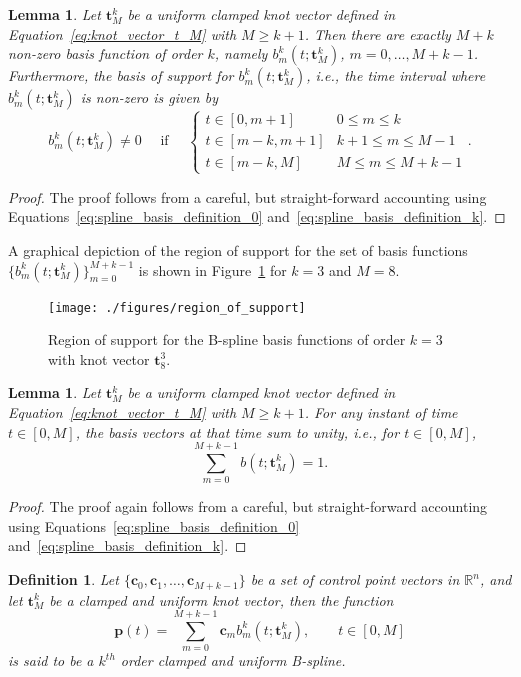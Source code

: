 \documentclass{article}
\newtheorem{lemma}[theorem]{Lemma}
\newtheorem{definition}[theorem]{Definition}
\newcommand{\cbf}{\mathbf{c}}
\begin{document}
\begin{lemma} \label{lem:nonzero_basis_vectors}
	Let $\mathbf{t}_M^k$ be a uniform clamped knot vector defined in Equation~\eqref{eq:knot_vector_t_M} with $M\geq k+1$.
	Then there are exactly $M+k$ non-zero basis function of order $k$, namely $b_m^k(t;\mathbf{t}_M^k)$, $m=0, \dots, M+k-1$.
	Furthermore, the basis of support for $b_m^k(t;\mathbf{t}_M^k)$, i.e., the time interval where $b_m^k(t;\mathbf{t}_M^k)$ is non-zero is given by
		\[
				b_m^k(t;\mathbf{t}_M^k) \neq 0 
				\quad \text{~if~} \quad
				\begin{cases}
				t \in [0, m+1] & 0\leq m \leq k \\
				t \in [m-k, m+1] & k+1 \leq m \leq M-1 \\
				t \in [m-k, M] & M \leq m \leq M+k-1
				\end{cases}.
		\]	
\end{lemma}
\begin{proof}  The proof follows from a careful, but straight-forward accounting using Equations~\eqref{eq:spline_basis_definition_0} and~\eqref{eq:spline_basis_definition_k}.	
\end{proof}

A graphical depiction of the region of support for the set of basis functions $\{b_m^k(t;\mathbf{t}_M^k)\}_{m=0}^{M+k-1}$ is shown in Figure~\ref{fig:region_of_support} for $k=3$ and $M=8$.
\begin{figure}[hbt]
  \centering\texttt{[image: ./figures/region\_of\_support]}
  \caption{Region of support for the B-spline basis functions of order $k=3$ with knot vector $\mathbf{t}_8^3$.}
  \label{fig:region_of_support}  
\end{figure}

\begin{lemma} \label{lem:basis_vectors_sum_to_1}
	Let $\mathbf{t}_M^k$ be a uniform clamped knot vector defined in Equation~\eqref{eq:knot_vector_t_M} with $M\geq k+1$. For any instant of time $t\in[0,M]$, the basis vectors at that time sum to unity, i.e., for $t\in[0, M]$,
	\[
	\sum_{m=0}^{M+k-1} b(t; \mathbf{t}_M^k) = 1.
	\]
\end{lemma}
\begin{proof}  The proof again follows from a careful, but straight-forward accounting using Equations~\eqref{eq:spline_basis_definition_0} and~\eqref{eq:spline_basis_definition_k}.	
\end{proof}

\begin{definition}
Let $\{\cbf_0, \cbf_1, \dots, \cbf_{M+k-1}\}$ be a set of control point vectors in $\mathbb{R}^n$, and let $\mathbf{t}_M^k$ be a clamped and uniform knot vector, then the function 
\begin{equation}\label{eq:clamped_uniform_spline}
\mathbf{p}(t) = \sum_{m=0}^{M+k-1} \cbf_m b_m^k(t; \mathbf{t}_M^k), \qquad t\in[0, M]
\end{equation}
is said to be a $k^{th}$ order clamped and uniform B-spline. 
\end{definition}
\end{document}
